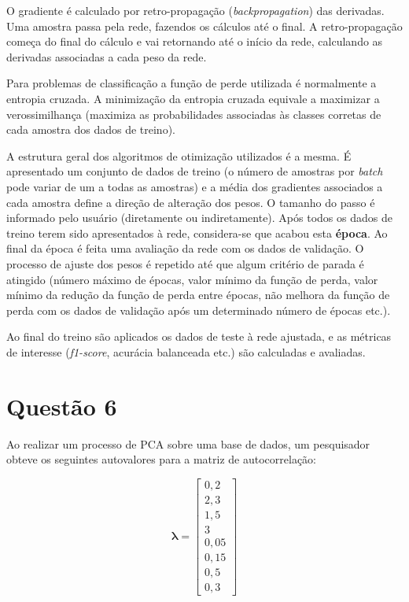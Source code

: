 \documentclass[final,3p]{elsarticle}
\numberwithin{equation}{section}
\begin{document}
        O gradiente é calculado por retro-propagação (\emph{backpropagation}) das derivadas. Uma amostra passa pela rede, fazendos os cálculos até o final. A retro-propagação começa do final do cálculo e vai retornando até o início da rede, calculando as derivadas associadas a cada peso da rede.

        Para problemas de classificação a função de perde utilizada é normalmente a entropia cruzada. A minimização da entropia cruzada equivale a maximizar a verossimilhança (maximiza as probabilidades associadas às classes corretas de cada amostra dos dados de treino).

        A estrutura geral dos algoritmos de otimização utilizados é a mesma. É apresentado um conjunto de dados de treino (o número de amostras por \emph{batch} pode variar de um a todas as amostras) e a média dos gradientes associados a cada amostra define a direção de alteração dos pesos. O tamanho do passo é informado pelo usuário (diretamente ou indiretamente). Após todos os dados de treino terem sido apresentados à rede, considera-se que acabou esta \textbf{época}. Ao final da época é feita uma avaliação da rede com os dados de validação. O processo de ajuste dos pesos é repetido até que algum critério de parada é atingido (número máximo de épocas, valor mínimo da função de perda, valor mínimo da redução da função de perda entre épocas, não melhora da função de perda com os dados de validação após um determinado número de épocas etc.).

        Ao final do treino são aplicados os dados de teste à rede ajustada, e as métricas de interesse (\emph{f1-score}, acurácia balanceada etc.) são calculadas e avaliadas.


\section{Questão 6}

    Ao realizar um processo de PCA sobre uma base de dados, um pesquisador obteve os seguintes autovalores para a matriz de autocorrelação:

    \begin{equation}
        \mathbf{\lambda{}} =
        \begin{bmatrix}
            0,2 \\
            2,3 \\
            1,5 \\
            3 \\
            0,05 \\
            0,15 \\
            0,5 \\
            0,3
        \end{bmatrix}
    \end{equation}
\end{document}
